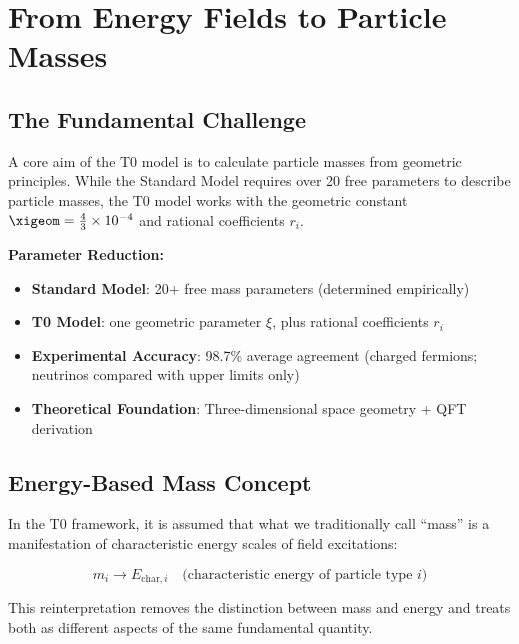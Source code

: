 	\section{From Energy Fields to Particle Masses}
	\label{sec:energy_fields_to_masses}
	
	\subsection{The Fundamental Challenge}
	\label{subsec:fundamental_challenge}
	
	A core aim of the T0 model is to calculate particle masses from geometric principles. While the Standard Model requires over 20 free parameters to describe particle masses, the T0 model works with the geometric constant $\xigeom = \frac{4}{3} \times 10^{-4}$ and rational coefficients $r_i$.
	
	\begin{tcolorbox}[colback=green!5!white,colframe=green!75!black,title=Mass Description]
		\textbf{Parameter Reduction:}
		\begin{itemize}
			\item \textbf{Standard Model}: 20+ free mass parameters (determined empirically)
			\item \textbf{T0 Model}: one geometric parameter $\xi$, plus rational coefficients $r_i$
			\item \textbf{Experimental Accuracy}: 98.7\% average agreement (charged fermions; neutrinos compared with upper limits only)
			\item \textbf{Theoretical Foundation}: Three-dimensional space geometry + QFT derivation
		\end{itemize}
	\end{tcolorbox}
	
	\subsection{Energy-Based Mass Concept}
	\label{subsec:energy_based_mass}
	
	In the T0 framework, it is assumed that what we traditionally call ``mass'' is a manifestation of characteristic energy scales of field excitations:
	
	\begin{equation}
		\boxed{m_i \rightarrow E_{\text{char},i} \quad \text{(characteristic energy of particle type } i\text{)}}
		\label{eq:mass_to_energy}
	\end{equation}
	
	This reinterpretation removes the distinction between mass and energy and treats both as different aspects of the same fundamental quantity.
	
